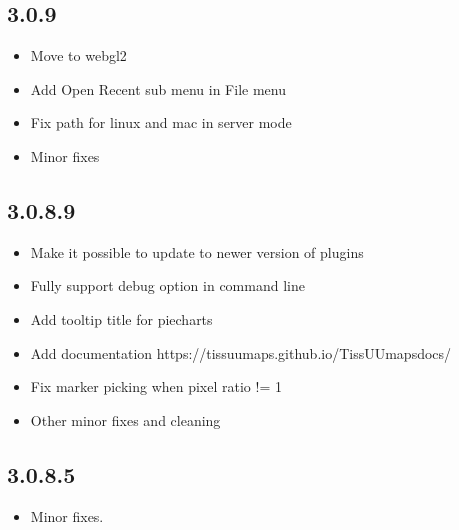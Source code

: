 \documentclass[letterpaper,10pt,english,openany,oneside]{sphinxmanual}
\begin{document}
\subsection{3.0.9}
\label{\detokenize{docs/intro/versions:id34}}\begin{itemize}
\item {} 
\sphinxAtStartPar
Move to webgl2

\item {} 
\sphinxAtStartPar
Add Open Recent sub menu in File menu

\item {} 
\sphinxAtStartPar
Fix path for linux and mac in server mode

\item {} 
\sphinxAtStartPar
Minor fixes

\end{itemize}


\subsection{3.0.8.9}
\label{\detokenize{docs/intro/versions:id35}}\begin{itemize}
\item {} 
\sphinxAtStartPar
Make it possible to update to newer version of plugins

\item {} 
\sphinxAtStartPar
Fully support \textendash{}debug option in command line

\item {} 
\sphinxAtStartPar
Add tooltip title for piecharts

\item {} 
\sphinxAtStartPar
Add documentation https://tissuumaps.github.io/TissUUmaps\sphinxhyphen{}docs/

\item {} 
\sphinxAtStartPar
Fix marker picking when pixel ratio != 1

\item {} 
\sphinxAtStartPar
Other minor fixes and cleaning

\end{itemize}


\subsection{3.0.8.5}
\label{\detokenize{docs/intro/versions:id36}}\begin{itemize}
\item {} 
\sphinxAtStartPar
Minor fixes.

\end{itemize}
\end{document}
